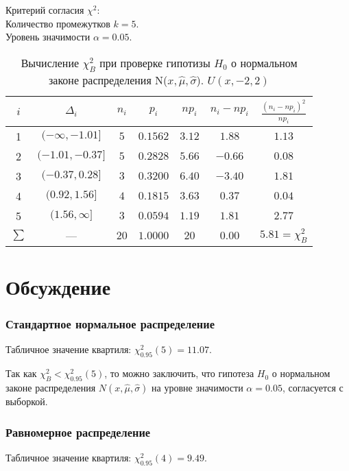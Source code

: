 \documentclass[12pt,a4paper]{article}
\begin{document}
			Критерий согласия $\chi^2$:\\
			Количество промежутков $k = 5$.\\
			Уровень значимости $\alpha = 0.05$.
			\begin{table}[H]
				\begin{center}
					\begin{tabular}{|c|c|c|c|c|c|c|}
						\hline
						$i$ & $\Delta_i$          &   $n_i$ &   $p_i$ &   $np_i$ &   $n_i-np_i$ &   $\frac{(n_i-np_i)^2}{np_i}$ \\
						\hline
						1   & $(-\infty, -1.01]$ & $5$  & $0.1562$ & $3.12$ & $1.88$  & $1.13$ \\
						2   & $(-1.01, -0.37]$   & $5$  & $0.2828$ & $5.66$ & $-0.66$ & $0.08$ \\
						3   & $(-0.37, 0.28]$    & $3$  & $0.3200$ & $6.40$ & $-3.40$ & $1.81$ \\
						4   & $(0.92, 1.56]$     & $4$  & $0.1815$ & $3.63$ & $0.37$  & $0.04$ \\
						5   & $(1.56, \infty]$   & $3$  & $0.0594$ & $1.19$ & $1.81$  & $2.77$ \\
						$\sum$ & ---             & $20$ & $1.0000$ & $20$   & $0.00$  & $5.81 = \chi^2_B$ \\
						\hline
					\end{tabular}
				\end{center}
				\caption{Вычисление $\chi^2_B$ при проверке гипотизы $H_0$ о нормальном законе распределения N($x, \hat{\mu}, \hat{\sigma}$). $U(x, -2, 2)$}
			\end{table}

	\section{Обсуждение}
	\subsubsection{Стандартное нормальное распределение}
	Табличное значение квартиля: $\chi^2_{0.95}(5) = 11.07$.
	
	Так как $\chi^2_B < \chi^2_{0.95}(5)$, то можно заключить, что гипотеза $H_0$ о нормальном законе распределения $N(x, \hat{\mu}, \hat{\sigma})$ на уровне значимости $\alpha = 0.05$, согласуется с выборкой.
	\subsubsection{Равномерное распределение}
	Табличное значение квартиля: $\chi^2_{0.95}(4) = 9.49$.
	
\end{document}
